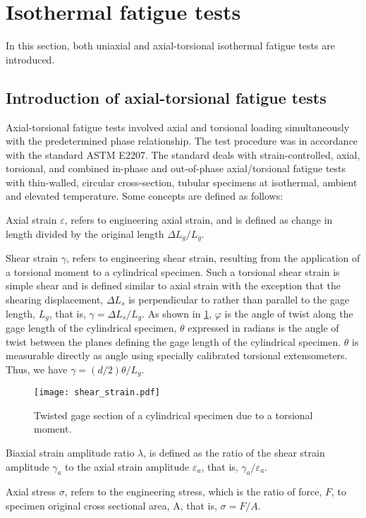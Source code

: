 \section{Isothermal fatigue tests}
\noindent
In this section, both uniaxial and axial-torsional isothermal fatigue tests are introduced.
\subsection{Introduction of axial-torsional fatigue tests}
\noindent
Axial-torsional fatigue tests involved axial and torsional loading simultaneously with the predetermined phase relationship.
The test procedure was in accordance with the standard ASTM E2207.
The standard deals with strain-controlled, axial, torsional, and combined in-phase and out-of-phase axial/torsional fatigue tests with thin-walled, circular cross-section, tubular specimens at isothermal, ambient and elevated temperature.
Some concepts are defined as follows:

Axial strain $\varepsilon$, refers to engineering axial strain, and is defined as change in length divided by the original length $\Delta L_g/L_g$.

Shear strain $\gamma$, refers to engineering shear strain, resulting from the application of a torsional moment to a cylindrical specimen.
Such a torsional shear strain is simple shear and is defined similar to axial strain with the exception that the shearing displacement, $\Delta L_s$ is perpendicular to rather than parallel to the gage length, $L_g$, that is, $\gamma=\Delta L_s/L_g$.
As shown in \ref{Fig:Shear_Strain}, $\varphi$ is the angle of twist along the gage length of the cylindrical specimen, $\theta$ expressed in radians is the angle of twist between the planes defining the gage length of the cylindrical specimen.
$\theta$ is measurable directly as angle using specially calibrated torsional extensometers.
Thus, we have $\gamma = (d/2)\theta/ L_g$.

\begin{figure}[!htp]
  \centering
  \texttt{[image: shear\_strain.pdf]}
  \caption{Twisted gage section of a cylindrical specimen due to a torsional moment.}
  \label{Fig:Shear_Strain}
\end{figure}

Biaxial strain amplitude ratio $\lambda$, is defined as the ratio of the shear strain amplitude $\gamma_a$ to the axial strain amplitude $\varepsilon_a$, that is, $\gamma_a/\varepsilon_a$.

Axial stress $\sigma$, refers to the engineering stress, which is the ratio of force, $F$, to specimen original cross sectional area, A, that is, $\sigma=F/A$.

